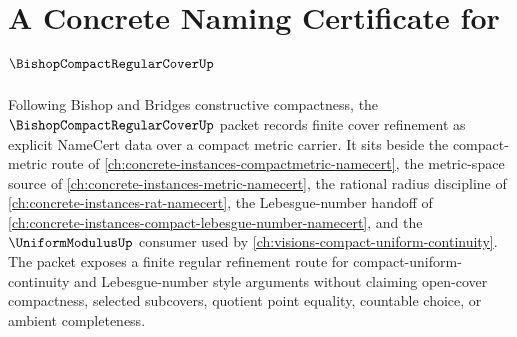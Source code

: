 \chapter{A Concrete Naming Certificate for $\BishopCompactRegularCoverUp$}
\label{ch:concrete-instances-compact-regular-cover-namecert}

Following Bishop and Bridges constructive compactness, the $\BishopCompactRegularCoverUp$ packet records finite cover refinement as explicit NameCert data over a compact metric carrier. It sits beside the compact-metric route of \autoref{ch:concrete-instances-compactmetric-namecert}, the metric-space source of \autoref{ch:concrete-instances-metric-namecert}, the rational radius discipline of \autoref{ch:concrete-instances-rat-namecert}, the Lebesgue-number handoff of \autoref{ch:concrete-instances-compact-lebesgue-number-namecert}, and the $\UniformModulusUp$ consumer used by \autoref{ch:visions-compact-uniform-continuity}. The packet exposes a finite regular refinement route for compact-uniform-continuity and Lebesgue-number style arguments without claiming open-cover compactness, selected subcovers, quotient point equality, countable choice, or ambient completeness.

